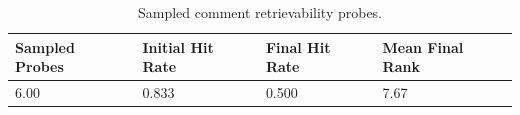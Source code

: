 \begin{table}[h]
\centering
\caption{Sampled comment retrievability probes.}
\label{tab:comment-probes}
\begin{tabular}{llll}
\hline
Sampled Probes & Initial Hit Rate & Final Hit Rate & Mean Final Rank \\
\hline
6.00 & 0.833 & 0.500 & 7.67 \\
\hline
\end{tabular}
\end{table}